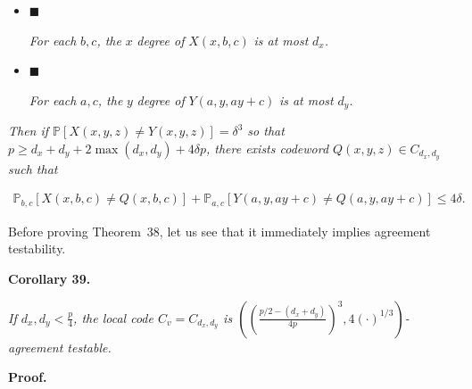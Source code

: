 \begin{itemize}


\item[] 
$\blacksquare$ 


\emph{For each }$b,c$\emph{, the }$x$\emph{ degree of }$X(x,b,c)$\emph{ is at most }$d_{x}$\emph{.}\par





\item[] 
$\blacksquare$ 


\emph{For each }$a,c$\emph{, the }$y$\emph{ degree of }$Y(a,y,ay+c)$\emph{ is at most }$d_{y}$\emph{.}\par





\end{itemize}


\emph{Then if $\mathbb{P}[X(x,y,z)\not=Y(x,y,z)]=\delta^{3}$ so that $p\geq d_{x}+d_{y}+2\max(d_{x},d_{y})+4\delta p$, there exists codeword $Q(x,y,z)\in C_{d_{x},d_{y}}$ such that}\par


\[\begin{gathered}
\mathbb{P}_{b,c}[X(x,b,c)\not=Q(x,b,c)]+\mathbb{P}_{a,c}[Y(a,y,ay+c)\not=Q(a,y,ay+c)]\leq 4\delta.
\end{gathered}\]






Before proving Theorem 38, let us see that it immediately implies agreement testability.\par





\par\medskip\noindent\textbf{
\textbf{Corollary 39}\textbf{.}
}\par



\emph{If $d_{x},d_{y}<\frac{p}{4}$, the local code $C_{v}=C_{d_{x},d_{y}}$ is $\left(\left(\frac{p/2-(d_{x}+d_{y})}{4p}\right)^{3},4(\cdot)^{1/3}\right)$-agreement testable.}\par






\par\medskip\noindent\textbf{Proof.}\par




